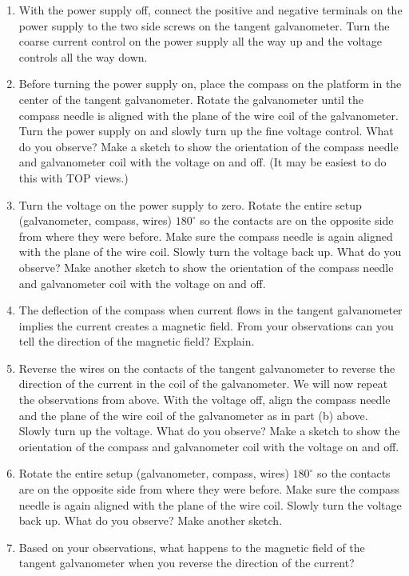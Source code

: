 \begin{enumerate}[labparts]
\item With the power supply off, connect the positive and negative terminals 
on the power supply to the two side screws on the tangent galvanometer. Turn 
the coarse current control on the power supply all the way up and the voltage 
controls all the way down.

\item Before turning the power supply on, place the compass on the platform 
in the center of the tangent galvanometer. Rotate the galvanometer until the 
compass needle is aligned with the plane of the wire coil of the galvanometer.
Turn the power supply on and slowly turn up the fine voltage control.
What do you observe? Make a sketch to show the orientation of the compass 
needle and galvanometer coil with the voltage on and off. 
(It may be easiest to do this with TOP views.)
\vspace{20mm}

\item Turn the voltage on the power supply to zero.
Rotate the entire setup (galvanometer, compass, wires) $180^\circ$
so the contacts are on the opposite side from where they were before.
Make sure the compass needle is again aligned with the plane of the wire coil.
Slowly turn the voltage back up. What do you observe?
Make another sketch to show the orientation of the compass needle and
galvanometer coil with the voltage on and off.
\vspace{30mm}

\item The deflection of the compass when current flows in the tangent 
galvanometer implies the current creates a magnetic field.
From your observations can you tell the direction
of the magnetic field?  Explain.
\vspace{30mm}

\item Reverse the wires on the contacts of the tangent galvanometer to reverse 
the direction of the current in the coil of the galvanometer.
We will now repeat the observations from above.
With the voltage off, align the compass needle and the plane of the wire coil 
of the galvanometer as in part (b) above.
Slowly turn up the voltage.
What do you observe?
Make a sketch to show the orientation of the compass and
galvanometer coil with the voltage on and off.
\vspace{30mm}

\item Rotate the entire setup (galvanometer, compass, wires) $180^\circ$
so the contacts are on the opposite side from where they were before.
Make sure the compass needle is again aligned with the plane of the wire coil.
Slowly turn the voltage back up. What do you observe?
 Make another sketch.
\vspace{30mm}

\item Based on your observations, what happens to the magnetic field of the 
tangent galvanometer when you reverse the direction of the current?

\end{enumerate}


